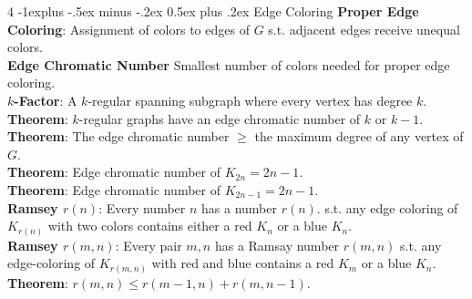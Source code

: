 \documentclass[letterpaper, 8pt]{extarticle}
\makeatletter
\renewcommand{\section}{\@startsection{section}{1}{0mm}%
	{-1explus -.5ex minus -.2ex}%
	{0.5ex plus .2ex}%
	{\normalfont\normalsize\bfseries}}
\makeatother
\begin{document}
\begin{multicols*}{4}
	\section{Edge Coloring}
	\textbf{Proper Edge Coloring}: Assignment of colors to edges of $G$ s.t. adjacent edges receive unequal colors. \\
	\textbf{Edge Chromatic Number} Smallest number of colors needed for proper edge coloring. \\
	\textbf{$k$-Factor}: A $k$-regular spanning subgraph where every vertex has degree $k$. \\
	\textbf{Theorem}: $k$-regular graphs have an edge chromatic number of $k$ or $k-1$. \\
	\textbf{Theorem}: The edge chromatic number $\ge$ the maximum degree of any vertex of $G$. \\
	\textbf{Theorem}: Edge chromatic number of $K_{2n} = 2n-1$. \\
	\textbf{Theorem}: Edge chromatic number of $K_{2n-1} = 2n-1$. \\
	\textbf{Ramsey $r(n)$}: Every number $n$ has a number $r(n)$. s.t. any edge coloring of $K_{r(n)}$ with two colors contains either a red $K_n$ or a blue $K_n$. \\
	\textbf{Ramsey $r(m,n)$}: Every pair $m,n$ has a Ramsay number $r(m,n)$ s.t. any edge-coloring of $K_{r(m,n)}$ with red and blue contains a red $K_m$ or a blue $K_n$. \\
	\textbf{Theorem}: $r(m,n) \le r(m-1,n) + r(m,n-1)$. \\


\end{multicols*}
\end{document}
